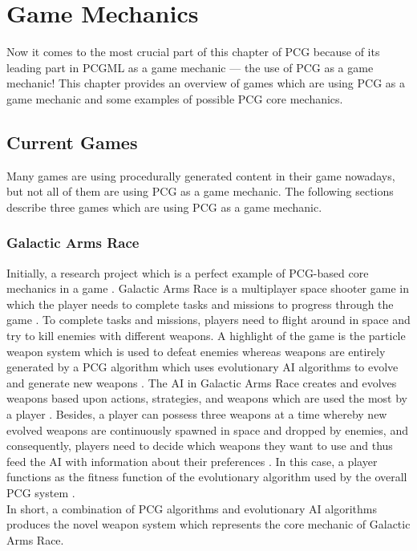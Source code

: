 \documentclass[MGS,Master,english]{twbook}%
\begin{document}
\section{Game Mechanics}
Now it comes to the most crucial part of this chapter of PCG because of its leading part in PCGML as a game mechanic — the use of PCG as a game mechanic! This chapter provides an overview of games which are using PCG as a game mechanic and some examples of possible PCG core mechanics.

\subsection{Current Games} \label{pcgMechanicGames}
Many games are using procedurally generated content in their game nowadays, but not all of them are using PCG as a game mechanic. The following sections describe three games which are using PCG as a game mechanic.

\subsubsection{Galactic Arms Race}
Initially, a research project which is a perfect example of PCG-based core mechanics in a game \cite{game::galacticArmsRace}. Galactic Arms Race is a multiplayer space shooter game in which the player needs to complete tasks and missions to progress through the game \cite{game::galacticArmsRace}. To complete tasks and missions, players need to flight around in space and try to kill enemies with different weapons. A highlight of the game is the particle weapon system which is used to defeat enemies whereas weapons are entirely generated by a PCG algorithm which uses evolutionary AI algorithms to evolve and generate new weapons \cite{pcg::galacticArmsRace}. The AI in Galactic Arms Race creates and evolves weapons based upon actions, strategies, and weapons which are used the most by a player \cite{pcg::galacticArmsRace} \cite{pcg::galacticArmsRace::evolvingContent}. Besides, a player can possess three weapons at a time whereby new evolved weapons are continuously spawned in space and dropped by enemies, and consequently, players need to decide which weapons they want to use and thus feed the AI with information about their preferences \cite{pcg::galacticArmsRace::evolvingContent}. In this case, a player functions as the fitness function of the evolutionary algorithm used by the overall PCG system \cite{pcg::galacticArmsRace::evolvingContent}.\\
In short, a combination of PCG algorithms and evolutionary AI algorithms produces the novel weapon system which represents the core mechanic of Galactic Arms Race.
\end{document}

